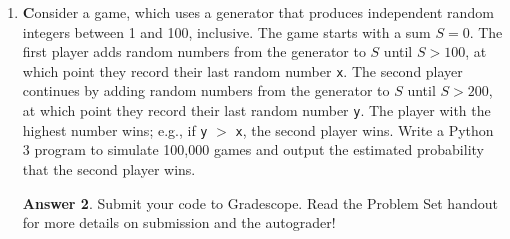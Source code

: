 \documentclass[12pt]{article}
\renewcommand{\(}{\left(}
\renewcommand{\)}{\right)}
\theoremstyle{definition}
\newtheorem*{answer}{Answer}
\begin{document}
\begin{enumerate}
\begin{enumerate}[label=\alph*.]
    \end{enumerate}

    \begin{shaded}
    \begin{answer}

    \end{answer}
    \end{shaded}
    \newpage


\item \textbf Consider a game, which uses a generator that produces independent random integers between 1 and 100, inclusive. The game starts with a sum $S = 0$. The first player adds random numbers from the generator to $S$ until $S > 100$, at which point they record their last random number \texttt{x}. The second player continues by adding random numbers from the generator to $S$ until $S > 200$, at which point they record their last random number \texttt{y}. The player with the highest number wins; e.g., if \texttt{y} $>$ \texttt{x}, the second player wins. Write a Python 3 program to simulate 100,000 games and output the estimated probability that the second player wins.

    \begin{shaded}
    \begin{answer}
Submit your code to Gradescope. Read the Problem Set handout for more details on submission and the autograder!
    \end{answer}
    \end{shaded}
    \newpage



\end{enumerate}
\end{document}
